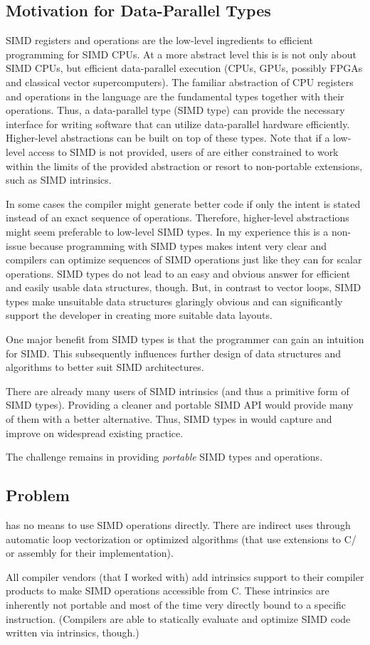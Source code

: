 \subsection{Motivation for Data-Parallel Types}
SIMD registers and operations are the low-level ingredients to efficient programming for SIMD CPUs.
At a more abstract level this is is not only about SIMD CPUs, but efficient data-parallel execution (CPUs, GPUs, possibly FPGAs and classical vector supercomputers).
The familiar abstraction of CPU registers and operations in the \CC{} language are the fundamental types together with their operations.
Thus, a data-parallel type (SIMD type) can provide the necessary interface for writing software that can utilize data-parallel hardware efficiently.
Higher-level abstractions can be built on top of these types.
Note that if a low-level access to SIMD is not provided, users of \CC{} are either constrained to work within the limits of the provided abstraction or resort to non-portable extensions, such as SIMD intrinsics.

In some cases the compiler might generate better code if only the intent is stated instead of an exact sequence of operations.
Therefore, higher-level abstractions might seem preferable to low-level SIMD types.
In my experience this is a non-issue because programming with SIMD types makes intent very clear and compilers can optimize sequences of SIMD operations just like they can for scalar operations.
SIMD types do not lead to an easy and obvious answer for efficient and easily usable data structures, though.
But, in contrast to vector loops, SIMD types make unsuitable data structures glaringly obvious and can significantly support the developer in creating more suitable data layouts.

One major benefit from SIMD types is that the programmer can gain an intuition for SIMD.
This subsequently influences further design of data structures and algorithms to better suit SIMD architectures.

There are already many users of SIMD intrinsics (and thus a primitive form of SIMD types).
Providing a cleaner and portable SIMD API would provide many of them with a better alternative.
Thus, SIMD types in \CC{} would capture and improve on widespread existing practice.

The challenge remains in providing \emph{portable} SIMD types and operations.

\subsection{Problem}
\CC{} has no means to use SIMD operations directly.
There are indirect uses through automatic loop vectorization or optimized algorithms (that use extensions to C/\CC{} or assembly for their implementation).

All compiler vendors (that I worked with) add intrinsics support to their compiler products to make SIMD operations accessible from C.
These intrinsics are inherently not portable and most of the time very directly bound to a specific instruction.
(Compilers are able to statically evaluate and optimize SIMD code written via intrinsics, though.)

